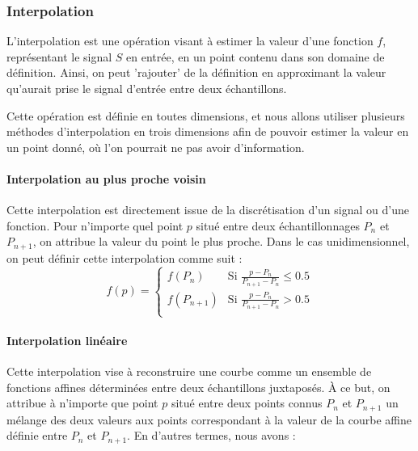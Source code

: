 {{{			\subsubsection{Interpolation}
			{
				\par

				L'interpolation est une opération visant à estimer la valeur d'une fonction $f$, représentant le signal $S$ en entrée, en un point contenu dans son domaine de définition. Ainsi, on peut 'rajouter' de la définition en approximant la valeur qu'aurait prise le signal d'entrée entre deux échantillons.\par

				\par

				Cette opération est définie en toutes dimensions, et nous allons utiliser plusieurs méthodes d'interpolation en trois dimensions afin de pouvoir estimer la valeur en un point donné, où l'on pourrait ne pas avoir d'information.\par

				\paragraph*{Interpolation au plus proche voisin}
				{
					Cette interpolation est directement issue de la discrétisation d'un signal ou d'une fonction. Pour n'importe quel point $p$ situé entre deux échantillonnages $P_n$ et $P_{n+1}$, on attribue la valeur du point le plus proche. Dans le cas unidimensionnel, on peut définir cette interpolation comme suit :\\
					\[f(p) = \left\{\begin{array}{ll} f(P_n) & \text{Si }\frac{p-P_n}{P_{n+1}-P_n}\leq0.5 \\ f(P_{n+1}) & \text{Si }\frac{p-P_n}{P_{n+1}-P_n}>0.5 \\\end{array}\right.\]
					\par
					\par

				}

				\paragraph*{Interpolation linéaire}
				{
					Cette interpolation vise à reconstruire une courbe comme un ensemble de fonctions affines déterminées entre deux échantillons juxtaposés. À ce but, on attribue à n'importe que point $p$ situé entre deux points connus $P_n$ et $P_{n+1}$ un mélange des deux valeurs aux points correspondant à la valeur de la courbe affine définie entre $P_n$ et $P_{n+1}$. En d'autres termes, nous avons :

}}}}}
